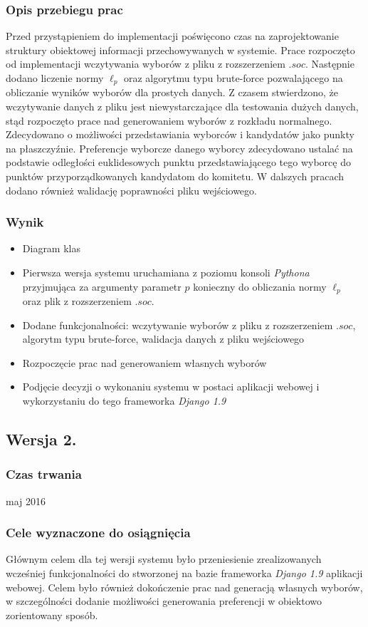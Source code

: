 \documentclass[pdflatex,11pt]{../aghdoc_version2}
\begin{document}
\subsubsection{Opis przebiegu prac}
Przed przystąpieniem do implementacji poświęcono czas na zaprojektowanie struktury obiektowej informacji przechowywanych w systemie. Prace rozpoczęto od implementacji wczytywania wyborów z pliku z rozszerzeniem $.soc$.
Następnie dodano liczenie normy $\ell_p$ oraz algorytmu typu brute-force pozwalającego na
obliczanie wyników wyborów dla prostych danych. Z czasem stwierdzono, że wczytywanie
danych z pliku jest niewystarczające dla testowania dużych danych, stąd rozpoczęto prace
nad generowaniem wyborów z rozkładu normalnego. Zdecydowano o możliwości
przedstawiania wyborców i kandydatów jako punkty na płaszczyźnie. Preferencje wyborcze
danego wyborcy zdecydowano ustalać na podstawie odległości euklidesowych punktu
przedstawiającego tego wyborcę do punktów przyporządkowanych kandydatom do komitetu.
W dalszych pracach dodano również walidację poprawności pliku wejściowego. 
\subsubsection{Wynik}
\begin{itemize}
\item Diagram klas
\item Pierwsza wersja systemu uruchamiana z poziomu konsoli \textit{Pythona} przyjmująca za
argumenty parametr $p$ konieczny do obliczania normy $\ell_p$ oraz plik z rozszerzeniem
$.soc$.
\item Dodane funkcjonalności: wczytywanie wyborów z pliku z rozszerzeniem $.soc$,
algorytm typu brute-force, walidacja danych z pliku wejściowego
\item Rozpoczęcie prac nad generowaniem własnych wyborów
\item Podjęcie decyzji o wykonaniu systemu w postaci aplikacji webowej i wykorzystaniu
do tego frameworka \textit{Django 1.9}
\end{itemize}

\newpage
\subsection{Wersja 2.}
\subsubsection{Czas trwania}
maj 2016
\subsubsection{Cele wyznaczone do osiągnięcia}
Głównym celem dla tej wersji systemu było przeniesienie zrealizowanych wcześniej
funkcjonalności do stworzonej na bazie frameworka \textit{Django 1.9} aplikacji webowej. Celem
było również dokończenie prac nad generacją własnych wyborów, w szczególności dodanie
możliwości generowania preferencji w obiektowo zorientowany sposób.
\end{document}
